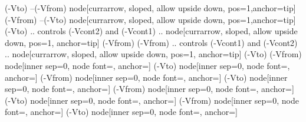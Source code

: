 {    %
    \else
    \ifpgfcirc@do@v@symbols
    \ifpgf@circuit@europeanvoltage
        \ifpgf@circuit@bipole@voltage@straight
            \ifpgf@circuit@bipole@voltage@backward
                (\pgfcirc@a@prefix-Vto) --(\pgfcirc@a@prefix-Vfrom) node[currarrow, sloped,  allow upside down, pos=1,anchor=tip] {}
            \else
                (\pgfcirc@a@prefix-Vfrom) --(\pgfcirc@a@prefix-Vto) node[currarrow, sloped,  allow upside down, pos=1,anchor=tip] {}
            \fi
        \else
            \ifpgf@circuit@bipole@voltage@backward
                (\pgfcirc@a@prefix-Vto) .. controls (\pgfcirc@a@prefix-Vcont2)  and (\pgfcirc@a@prefix-Vcont1) ..
                node[currarrow, sloped,  allow upside down, pos=1, anchor=tip] {}
                (\pgfcirc@a@prefix-Vfrom)
            \else
                (\pgfcirc@a@prefix-Vfrom) .. controls (\pgfcirc@a@prefix-Vcont1)  and (\pgfcirc@a@prefix-Vcont2) ..
                node[currarrow, sloped,  allow upside down, pos=1, anchor=tip] {}
                (\pgfcirc@a@prefix-Vto)
            \fi
        \fi
    \else %
        \ifpgf@circuit@bipole@voltage@backward
            \ifpgf@circ@oldvoltagedirection
                (\pgfcirc@a@prefix-Vfrom) node[inner sep=0, node font=\pgf@circ@avfont,
                    anchor=\pgf@circ@bipole@voltage@label@anchor]{\pgf@circ@avplus}
                (\pgfcirc@a@prefix-Vto) node[inner sep=0, node font=\pgf@circ@avfont,
                    anchor=\pgf@circ@bipole@voltage@label@anchor]{\pgf@circ@avminus}
            \else
                (\pgfcirc@a@prefix-Vfrom) node[inner sep=0, node font=\pgf@circ@avfont,
                    anchor=\pgf@circ@bipole@voltage@label@anchor]{\pgf@circ@avminus}
                (\pgfcirc@a@prefix-Vto) node[inner sep=0, node font=\pgf@circ@avfont,
                    anchor=\pgf@circ@bipole@voltage@label@anchor]{\pgf@circ@avplus}
            \fi
            \else
            \ifpgf@circ@oldvoltagedirection
                (\pgfcirc@a@prefix-Vfrom) node[inner sep=0, node font=\pgf@circ@avfont,
                    anchor=\pgf@circ@bipole@voltage@label@anchor]{\pgf@circ@avminus}
                (\pgfcirc@a@prefix-Vto) node[inner sep=0, node font=\pgf@circ@avfont,
                    anchor=\pgf@circ@bipole@voltage@label@anchor]{\pgf@circ@avplus}
            \else
                (\pgfcirc@a@prefix-Vfrom) node[inner sep=0, node font=\pgf@circ@avfont,
                    anchor=\pgf@circ@bipole@voltage@label@anchor]{\pgf@circ@avplus}
                (\pgfcirc@a@prefix-Vto) node[inner sep=0, node font=\pgf@circ@avfont,
                    anchor=\pgf@circ@bipole@voltage@label@anchor]{\pgf@circ@avminus}
            \fi
        \fi
    \fi
    \fi %
    \fi %
}

